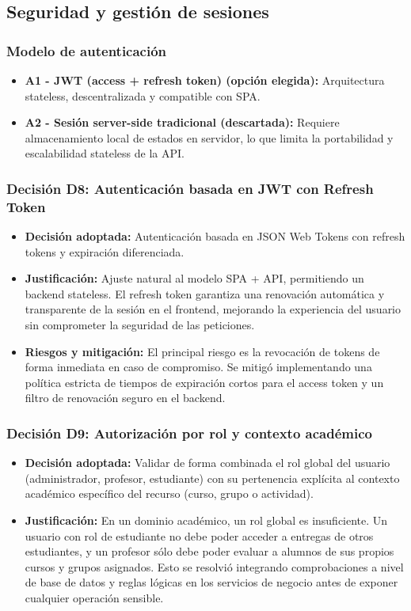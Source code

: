\FloatBarrier
\subsection{Seguridad y gesti\'on de sesiones}

\subsubsection*{Modelo de autenticaci\'on}
\begin{itemize}
    \item \textbf{A1 - JWT (access + refresh token) (opci\'on elegida):} Arquitectura stateless, descentralizada y compatible con SPA.
    \item \textbf{A2 - Sesi\'on server-side tradicional (descartada):} Requiere almacenamiento local de estados en servidor, lo que limita la portabilidad y escalabilidad stateless de la API.
\end{itemize}

\subsubsection*{Decisi\'on D8: Autenticaci\'on basada en JWT con Refresh Token}
\begin{itemize}
    \item \textbf{Decisi\'on adoptada:} Autenticaci\'on basada en JSON Web Tokens con refresh tokens y expiraci\'on diferenciada.
    \item \textbf{Justificaci\'on:} Ajuste natural al modelo SPA + API, permitiendo un backend stateless. El refresh token garantiza una renovaci\'on autom\'atica y transparente de la sesi\'on en el frontend, mejorando la experiencia del usuario sin comprometer la seguridad de las peticiones.
    \item \textbf{Riesgos y mitigaci\'on:} El principal riesgo es la revocaci\'on de tokens de forma inmediata en caso de compromiso. Se mitig\'o implementando una pol\'itica estricta de tiempos de expiraci\'on cortos para el access token y un filtro de renovaci\'on seguro en el backend.
\end{itemize}

\subsubsection*{Decisi\'on D9: Autorizaci\'on por rol y contexto acad\'emico}
\begin{itemize}
    \item \textbf{Decisi\'on adoptada:} Validar de forma combinada el rol global del usuario (administrador, profesor, estudiante) con su pertenencia expl\'icita al contexto acad\'emico específico del recurso (curso, grupo o actividad).
    \item \textbf{Justificaci\'on:} En un dominio acad\'emico, un rol global es insuficiente. Un usuario con rol de estudiante no debe poder acceder a entregas de otros estudiantes, y un profesor s\'olo debe poder evaluar a alumnos de sus propios cursos y grupos asignados. Esto se resolvi\'o integrando comprobaciones a nivel de base de datos y reglas l\'ogicas en los servicios de negocio antes de exponer cualquier operaci\'on sensible.
\end{itemize}

